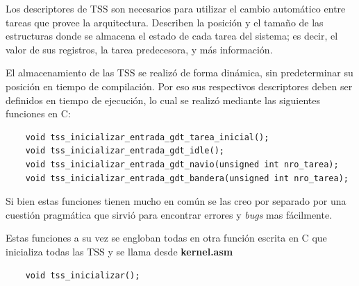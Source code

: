 	Los descriptores de TSS son necesarios para utilizar el cambio automático entre tareas 
que provee la arquitectura. Describen la posición y el tamaño de las estructuras donde se almacena 
el estado de cada tarea del sistema; es decir, el valor de sus registros, la tarea predecesora, y más información.

	El almacenamiento de las TSS se realizó de forma dinámica, sin predeterminar su posición en 
tiempo de compilación. Por eso sus respectivos descriptores deben ser definidos en tiempo de 
ejecución, lo cual se realizó mediante las siguientes funciones en C:

\begin{verbatim}
	void tss_inicializar_entrada_gdt_tarea_inicial();
	void tss_inicializar_entrada_gdt_idle();
	void tss_inicializar_entrada_gdt_navio(unsigned int nro_tarea);
	void tss_inicializar_entrada_gdt_bandera(unsigned int nro_tarea);
\end{verbatim}

	Si bien estas funciones tienen mucho en común se las creo por separado
por una cuestión pragmática que sirvió para encontrar errores y \textit{bugs} mas
fácilmente.

	Estas funciones a su vez se engloban todas en otra función escrita en C que
inicializa todas las TSS y se llama desde \textbf{kernel.asm}

\begin{verbatim}
	void tss_inicializar();
\end{verbatim}

